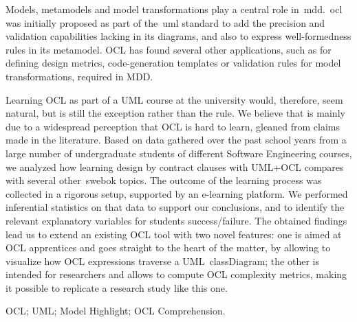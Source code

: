 Models, metamodels and model transformations play a central role in~\gls{mdd}.~\gls{ocl} was initially proposed as part of the~\gls{uml} standard to add the precision and validation capabilities lacking in its diagrams, and also to express well-formedness rules in its metamodel. OCL has found several other applications, such as for defining design metrics, code-generation templates or validation rules for model transformations, required in MDD.

Learning OCL as part of a UML course at the university would, therefore, seem natural, but is still the exception rather than the rule. We believe that is mainly due to a widespread perception that OCL is hard to learn, gleaned from claims made in the literature. Based on data gathered over the past school years from a large number of undergraduate students of different Software Engineering courses, we analyzed how learning design by contract clauses with UML+OCL compares with several other~\gls{swebok} topics. The outcome of the learning process was collected in a rigorous setup, supported by an e-learning platform. We performed inferential statistics on that data to support our conclusions, and to identify the relevant explanatory variables for students success/failure. The obtained findings lead us to extend an existing OCL tool with two novel features: one is aimed at OCL apprentices and goes straight to the heart of the matter, by allowing to visualize how OCL expressions traverse a UML~\gls{classDiagram}; the other is intended for researchers and allows to compute OCL complexity metrics, making it possible to replicate a research study like this one.

\begin{keywords}
OCL; UML; Model Highlight; OCL Comprehension.
\end{keywords} 

